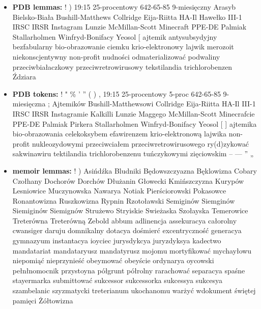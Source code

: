 \begin{itemize}
    \item \textbf{PDB lemmas:} ! ) 19:15 25-procentowy 642-65-85 9-miesięczny Arasyb Bielsko-Biała Bushill-Matthews Collridge Eija-Riitta HA-Il Hawełko III-1 IRSC IRSR Instagram Lunzie McMillan-Scott Minecraft PPE-DE Palmiak Stallarholmen Winfryd-Bonifacy Yeosol [ ajtemik antysubsydyjny bezfabularny bio-obrazowanie ciemku krio-elektronowy lajwik merozoit niekonscjentywny non-profit nudności odmaterializować podwaliny przeciwbiałaczkowy przeciwretrowirusowy tekstilandia trichlorobenzen Ździara
    \item \textbf{PDB tokens:} ! " \% ' '' ( ) , 19:15 25-procentowy 5-proc 642-65-85 9-miesięczna ; Ajtemików Bushill-Matthewsowi Collridge Eija-Riitta HA-Il III-1 IRSC IRSR Instagramie Kalkilli Lunzie Maggego McMillan-Scott Minecrafcie PPE-DE Palmiak Pirkera Stallarholmen Winfryd-Bonifacy Yeosol [ ] ajtemika bio-obrazowania celekoksybem efawirenzem krio-elektronową lajwika non-profit nukleozydowymi przeciwciałem przeciwretrowirusowego ry(d)zykować sakwinawiru tektilandia trichlorobenzenu tuńczykowymi zięciowskim – — ” „
    \item \textbf{memoir lemmas:} ! ) Asińdźka Bludniki Będowszczyazna Bęklowizna Cobary Czołhany Dochorów Dorchów Dłużanin Głowecki Kmińszczyzna Kurypów Lesniowice Muczynowska Nawarya Notiak Pierściorowski Pokasowce Ronantowizna Ruszkowizna Rypnin Rzotoławski Semiginów Siemginów Siemiginów Siemignów Strużewo Stryiskie Swieżaska Szołayska Temerowice Treterówna Treterówną Zebold abbum adlinencja assekuracya całorolny cwansiger daruju domnikalny dotacya dośmierć excentryczność generacya gymnazyum instantacya ioyciec jurysdykcya juryzdyksya kadectwo mandatariat mandataryusz mandatyrusz mojomu mortyfikować mychayłowu niepomiąć nieprzynieść obeymować obeyście ordynarya oycowski pełnłnomocnik przystoyna półgrunt półrolny rarachować separacya spaśne stayermarka submittować sukcessor sukcessorka sukcessya sukcesya szambelanic szyzmatycki treterianum ukochanomu warżyć wdokument świętej pamięci Żółtowizna

\end{itemize}

